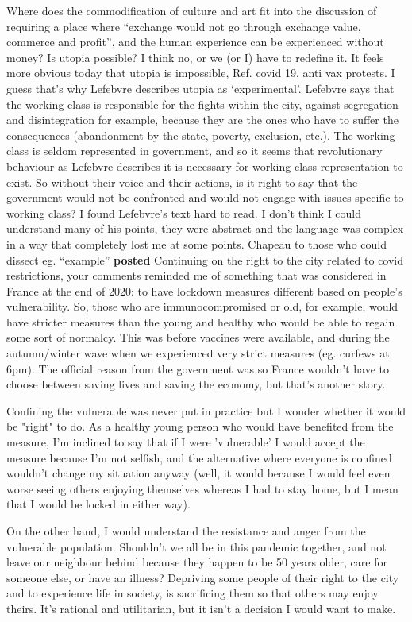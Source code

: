 \documentclass{article}
\begin{document}
\begin{outline}
	\1 Where does the commodification of culture and art fit into the discussion of requiring a place where ``exchange would not go through exchange value, commerce and profit'', and the human experience can be experienced without money?
	\1 Is utopia possible? I think no, or we (or I) have to redefine it. It feels more obvious today that utopia is impossible, Ref. covid 19, anti vax protests. I guess that's why Lefebvre describes utopia as `experimental'. 
	\1 Lefebvre says that the working class is responsible for the fights within the city, against segregation and disintegration for example, because they are the ones who have to suffer the consequences (abandonment by the state, poverty, exclusion, etc.). The working class is seldom represented in government, and so it seems that revolutionary behaviour as Lefebvre describes it is necessary for working class representation to exist. So without their voice and their actions, is it right to say that the government would not be confronted and would not engage with issues specific to working class?
	\1 I found Lefebvre's text hard to read. I don't think I could understand many of his points, they were abstract and the language was complex in a way that completely lost me at some points. Chapeau to those who could dissect eg. ``example''
	\1 \textbf{posted} Continuing on the right to the city related to covid restrictions, your comments reminded me of something that was considered in France at the end of 2020: to have lockdown measures different based on people's vulnerability. So, those who are immunocompromised or old, for example, would have stricter measures than the young and healthy who would be able to regain some sort of normalcy. This was before vaccines were available, and during the autumn/winter wave when we experienced very strict measures (eg. curfews at 6pm). The official reason from the government was so France wouldn't have to choose between saving lives and saving the economy, but that's another story.
	
Confining the vulnerable was never put in practice but I wonder whether it would be "right" to do. As a healthy young person who would have benefited from the measure, I'm inclined to say that if I were 'vulnerable' I would accept the measure because I'm not selfish, and the alternative where everyone is confined wouldn't change my situation anyway (well, it would because I would feel even worse seeing others enjoying themselves whereas I had to stay home, but I mean that I would be locked in either way).

On the other hand, I would understand the resistance and anger from the vulnerable population. Shouldn't we all be in this pandemic together, and not leave our neighbour behind because they happen to be 50 years older, care for someone else, or have an illness? Depriving some people of their right to the city and to experience life in society, is sacrificing them so that others may enjoy theirs. It's rational and utilitarian, but it isn't a decision I would want to make.
\end{outline}
\end{document}
